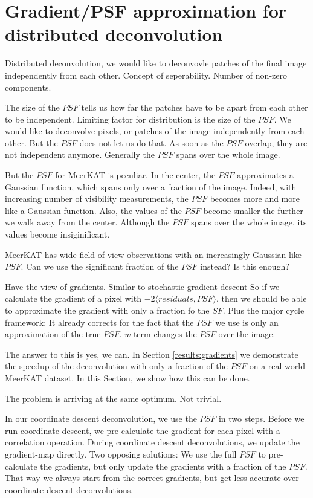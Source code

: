 \section{Gradient/PSF approximation for distributed deconvolution}

Distributed deconvolution, we would like to deconvovle patches of the final image independently from each other. 
Concept of seperability. Number of non-zero components.

The size of the $PSF$ tells us how far the patches have to be apart from each other to be independent.
Limiting factor for distribution is the size of the $PSF$. We would like to deconvolve pixels, or patches of the image independently from each other. But the $PSF$ does not let us do that. As soon as the $PSF$ overlap, they are not independent anymore.
Generally the $PSF$ spans over the whole image. 

But the $PSF$ for MeerKAT is peculiar.
In the center, the $PSF$ approximates a Gaussian function, which spans only over a fraction of the image. Indeed, with increasing number of visibility measurements, the $PSF$ becomes more and more like a Gaussian function.
Also, the values of the $PSF$ become smaller the further we walk away from the center. Although the $PSF$ spans over the whole image, its values become insiginificant.

MeerKAT has wide field of view observations with an increasingly Gaussian-like $PSF$. Can we use the significant fraction of the $PSF$ instead? Is this enough?

Have the view of gradients. 
Similar to stochastic gradient descent
So if we calculate the gradient of a pixel with $-2 \langle residuals, PSF \rangle$, then we should be able to approximate the gradient with only a fraction fo the $SF$.
Plus the major cycle framework: It already corrects for the fact that the $PSF$ we use is only an approximation of the true $PSF$. $w$-term changes the $PSF$ over the image. 



The answer to this is yes, we can. In Section \ref{results:gradients} we demonstrate the speedup of the deconvolution with only a fraction of the $PSF$ on a real world MeerKAT dataset. In this Section, we show how this can be done. 



The problem is arriving at the same optimum. Not trivial.

In our coordinate descent deconvolution, we use the $PSF$ in two steps. Before we run coordinate descent, we pre-calculate the gradient for each pixel with a correlation operation. During coordinate descent deconvolutions, we update the gradient-map directly. Two opposing solutions: We use the full $PSF$ to pre-calculate the gradients, but only update the gradients with a fraction of the $PSF$. That way we always start from the correct gradients, but get less accurate over coordinate descent deconvolutions.

